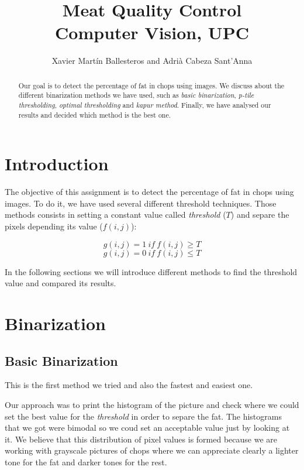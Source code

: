 \documentclass[12]{article}
\author{Xavier Martín Ballesteros and Adrià Cabeza Sant'Anna}
\title{Meat Quality Control \\ \large{Computer Vision, UPC}}
\begin{document}
\maketitle
  \vspace{1cm}
	\begin{abstract}
Our goal is to detect the percentage of fat in chops using images. We discuss about the different binarization methods we have used, such as \textit{basic binarization}, \textit{p-tile thresholding}, \textit{optimal thresholding} and \textit{kapur method}. Finally, we have analysed our results and decided which method is the best one.
\end{abstract}

\newpage
\tableofcontents
\section{Introduction}
The objective of this assignment is to detect the percentage of fat in chops using images. To do it, we have used several different threshold techniques. Those methods consists in setting a constant value called \textit{threshold} ($T$) and separe the pixels depending its value ($ f(i,j)$):
\vspace{-0.6cm}
\begin{center}
$$ g(i,j)=1\ if\ f(i,j) \geq T$$ 
$$ g(i,j)=0\ if\ f(i,j) \leq T$$
\end{center}

In the following sections we will introduce different methods to find the threshold value and compared its results. 

\section{Binarization}
\subsection{Basic Binarization}
This is the first method we tried and also the fastest and easiest one. 

\noindent Our approach was to print the histogram of the picture and check where we could set the best value for the \textit{threshold} in order to separe the fat. The histograms that we got were bimodal so we coud set an acceptable value just by looking at it. We believe that this distribution of pixel values is formed because we are working with grayscale pictures of chops where we can appreciate clearly a lighter tone for the fat and darker tones for the rest.
\end{document}
